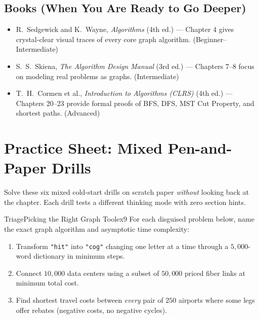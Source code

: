 \documentclass[11pt,a4paper]{article}
\theoremstyle{definition}
\begin{document}
\subsection*{Books (When You Are Ready to Go Deeper)}
\begin{itemize}
    \item R.\ Sedgewick and K.\ Wayne, \emph{Algorithms} (4th ed.) --- Chapter 4 gives crystal-clear visual traces of every core graph algorithm. (Beginner--Intermediate)
    \item S.\ S.\ Skiena, \emph{The Algorithm Design Manual} (3rd ed.) --- Chapters 7--8 focus on modeling real problems as graphs. (Intermediate)
    \item T.\ H.\ Cormen et al., \emph{Introduction to Algorithms (CLRS)} (4th ed.) --- Chapters 20--23 provide formal proofs of BFS, DFS, MST Cut Property, and shortest paths. (Advanced)
\end{itemize}

\section*{Practice Sheet: Mixed Pen-and-Paper Drills}

\noindent
Solve these six mixed cold-start drills on scratch paper \emph{without} looking back at the chapter. Each drill tests a different thinking mode with zero section hints.

\begin{tryitbox}{Triage}{Picking the Right Graph Tool}{ex9}
For each disguised problem below, name the exact graph algorithm and asymptotic time complexity:
\begin{enumerate}
    \item Transform \texttt{"hit"} into \texttt{"cog"} changing one letter at a time through a $5{,}000$-word dictionary in minimum steps.
    \item Connect $10{,}000$ data centers using a subset of $50{,}000$ priced fiber links at minimum total cost.
    \item Find shortest travel costs between \emph{every} pair of $250$ airports where some legs offer rebates (negative costs, no negative cycles).
\end{enumerate}
\end{tryitbox}
\end{document}
